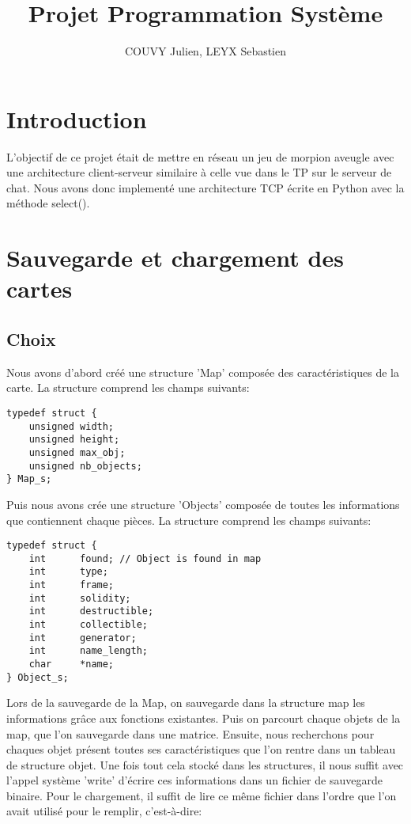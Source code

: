 \documentclass[a4paper]{article}
\title{Projet Programmation Système}
\author{COUVY Julien, LEYX Sebastien}
\begin{document}
\maketitle

\section{Introduction}
L'objectif de ce projet était de mettre en réseau un jeu de morpion aveugle avec une architecture client-serveur similaire à celle vue dans le TP sur le serveur de chat. Nous avons donc implementé une architecture TCP écrite en Python avec la méthode select().

\section{Sauvegarde et chargement des cartes}
\subsection{Choix}
Nous avons d'abord créé une structure 'Map' composée des caractéristiques de la carte. La structure comprend les champs suivants:

\begin{verbatim}
typedef struct {
    unsigned width;
    unsigned height;
    unsigned max_obj;
    unsigned nb_objects;
} Map_s;
\end{verbatim}

Puis nous avons crée une structure 'Objects' composée de toutes les informations que contiennent chaque pièces. La structure comprend les champs suivants:
\begin{verbatim}
typedef struct {
    int      found; // Object is found in map
    int      type;
    int      frame;
    int      solidity;
    int      destructible;
    int      collectible;
    int      generator;
    int      name_length;
    char     *name;
} Object_s;
\end{verbatim}

Lors de la sauvegarde de la Map, on sauvegarde dans la structure map les informations grâce aux fonctions existantes. Puis on parcourt chaque objets de la map, que l'on sauvegarde dans une matrice. Ensuite, nous recherchons pour chaques objet présent toutes ses caractéristiques que l'on rentre dans un tableau de structure objet. Une fois tout cela stocké dans les structures, il nous suffit avec l'appel système 'write' d'écrire ces informations dans un fichier de sauvegarde binaire. Pour le chargement, il suffit de lire ce même fichier dans l'ordre que l'on avait utilisé pour le remplir, c'est-à-dire:
\end{document}
